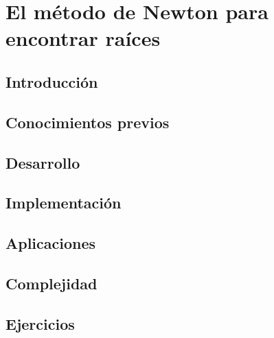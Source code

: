 \chapter{El método de Newton para encontrar raíces}
\section{Introducción}

\section{Conocimientos previos}

\section{Desarrollo}

\section{Implementación}

\section{Aplicaciones}

\section{Complejidad}

\section{Ejercicios}
